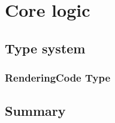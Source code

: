\chapter{Core logic}
\label{chap:corelogic}


\section{Type system}
\subsection{RenderingCode Type}
\subsection{}

\section{Summary}
